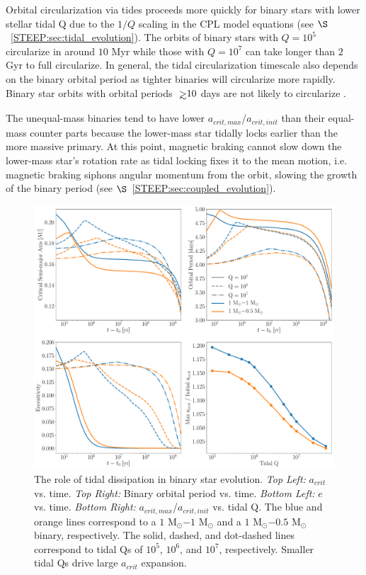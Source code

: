 Orbital circularization via tides proceeds more quickly for binary stars with lower stellar tidal Q due to the $1/Q$ scaling in the CPL model equations (see $\S$~\ref{STEEP:sec:tidal_evolution}).  The orbits of binary stars with $Q = 10^5$ circularize in around $10$ Myr while those with $Q = 10^7$ can take longer than $2$ Gyr to full circularize.  In general, the tidal circularization timescale also depends on the binary orbital period as tighter binaries will circularize more rapidly.  Binary star orbits with orbital periods $\gsim 10$ days are not likely to circularize \citep[e.g.][]{Zahn1989,Meibom2005,Raghavan2010,Lurie2017}.

The unequal-mass binaries tend to have lower $a_{crit,max}$/$a_{crit,init}$ than their equal-mass counter parts because the lower-mass star tidally locks earlier than the more massive primary.  At this point, magnetic braking cannot slow down the lower-mass star's rotation rate as tidal locking fixes it to the mean motion, i.e. magnetic braking siphons angular momentum from the orbit, slowing the growth of the binary period (see $\S$~\ref{STEEP:sec:coupled_evolution}).

\begin{figure}
	\includegraphics[width=\columnwidth]{var_Q.pdf}
    \caption{The role of tidal dissipation in binary star evolution. {\it Top Left:} $a_{crit}$ vs. time.  {\it Top Right:} Binary orbital period vs. time. {\it Bottom Left:} $e$ vs. time. {\it Bottom Right:} $a_{crit,max}$/$a_{crit,init}$ vs. tidal Q.  The blue and orange lines correspond to a $1$ M$_{\odot}$$-1$ M$_{\odot}$ and a $1$ M$_{\odot}$$-0.5$ M$_{\odot}$ binary, respectively.  The solid, dashed, and dot-dashed lines correspond to tidal Qs of $10^5$, $10^6$, and $10^7$, respectively.  Smaller tidal Qs drive large $a_{crit}$ expansion.}
    \label{STEEP:fig:var_Q}
\end{figure}

